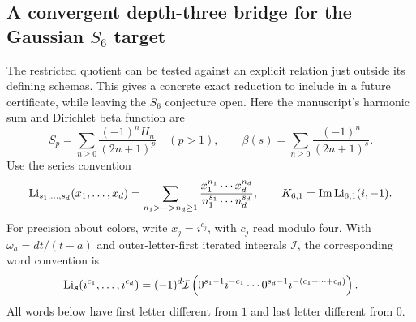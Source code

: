 \subsection{A convergent depth-three bridge for the Gaussian $S_6$ target}
\label{audit:s6-bridge}

The restricted quotient can be tested against an explicit relation just
outside its defining schemas. This gives a concrete exact reduction to
include in a future certificate, while leaving the $S_6$ conjecture open.
Here the manuscript's harmonic sum and Dirichlet beta function are
\[
 S_p=\sum_{n\ge0}\frac{(-1)^nH_n}{(2n+1)^p}\quad(p>1),
 \qquad
 \beta(s)=\sum_{n\ge0}\frac{(-1)^n}{(2n+1)^s}.
\]
Use the series convention
\[
 \operatorname{Li}_{s_1,\ldots,s_d}(x_1,\ldots,x_d)
 =\sum_{n_1>\cdots>n_d\ge1}
   \frac{x_1^{n_1}\cdots x_d^{n_d}}
        {n_1^{s_1}\cdots n_d^{s_d}},
 \qquad K_{6,1}=\operatorname{Im}\operatorname{Li}_{6,1}(i,-1).
\]
For precision about colors, write $x_j=i^{c_j}$, with $c_j$ read modulo
four. With $\omega_a=dt/(t-a)$ and outer-letter-first iterated integrals
$\mathcal I$, the corresponding word convention is
\begin{equation}
 \operatorname{Li}_{\boldsymbol s}(i^{c_1},\ldots,i^{c_d})
 =(-1)^d\mathcal I\left(
 0^{s_1-1}i^{-c_1}\cdots
 0^{s_d-1}i^{-(c_1+\cdots+c_d)}\right).
 \label{audit:s6-word-convention}
\end{equation}
All words below have first letter different from $1$ and last letter
different from $0$.

